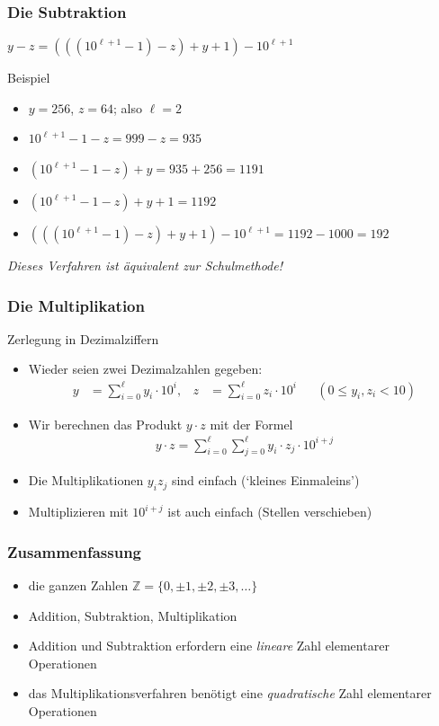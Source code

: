 \documentclass{beamer}
\renewcommand{\emph}[1]{{\textcolor{solarizedRed}{\itshape #1}}}
\newcommand\ZZ{\mathbb Z}
\newcommand\bc[1]{\left({#1}\right)}
\renewcommand{\ae}{\"a}
\renewcommand{\oe}{\"o}
\begin{document}
\begin{frame}\frametitle{Die Subtraktion}
	\hfill\emph{$y-z=\bc{\bc{ (10^{\ell+1}-1)-z }+y+1}-10^{\ell+1}$}
	\begin{block}{Beispiel}
		\begin{itemize}
			\item $y=256$, $z=64$; also $\ell=2$
			\item $10^{\ell+1}-1-z=999-z=935$
			\item $(10^{\ell+1}-1-z)+y=935+256=1191$
			\item $(10^{\ell+1}-1-z)+y+1=1192$
			\item $\bc{\bc{ (10^{\ell+1}-1)-z }+y+1}-10^{\ell+1}=1192-1000=192$
		\end{itemize}
	\end{block}
	{\itshape Dieses Verfahren ist \ae quivalent zur Schulmethode!}
\end{frame}

\begin{frame}\frametitle{Die Multiplikation}
\begin{block}{Zerlegung in Dezimalziffern}
\begin{itemize}
\item Wieder seien zwei Dezimalzahlen gegeben:
	\begin{align*}
		y&=\sum_{i=0}^\ell y_i\cdot 10^i,&
		z&=\sum_{i=0}^\ell z_i\cdot 10^i&&(0\leq y_i,z_i<10)
	\end{align*}
\item Wir berechnen das Produkt $y\cdot z$ mit der Formel
	\begin{align*}
		y\cdot z=\sum_{i=0}^\ell\sum_{j=0}^\ell y_i\cdot z_j\cdot 10^{i+j}
	\end{align*}
\item Die Multiplikationen $y_iz_j$ sind einfach (`kleines Einmaleins')
\item Multiplizieren mit $10^{i+j}$ ist auch einfach (Stellen verschieben)
\end{itemize}
\end{block}
\end{frame}

\begin{frame}\frametitle{Zusammenfassung}
\begin{itemize}
	\item die ganzen Zahlen $\ZZ=\{0,\pm1,\pm2,\pm3,\dots\}$
	\item Addition, Subtraktion, Multiplikation
	\item Addition und Subtraktion erfordern eine \emph{lineare} Zahl elementarer Operationen
	\item das Multiplikationsverfahren ben\oe tigt eine \emph{quadratische} Zahl elementarer Operationen
\end{itemize}
\end{frame}
\end{document}
